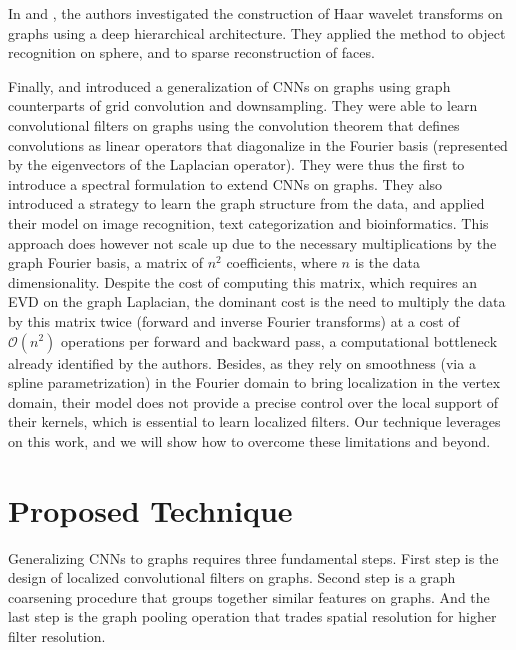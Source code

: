 \documentclass{article}
\newcommand{\bO}{\mathcal{O}}
\newcommand{\todo}[1]{{\color{red} #1 }}
\begin{document}
In \cite{pro:ChenChengMallat14deepHaar} and \cite{pro:RustamovGuibas14deepHaar},
the authors investigated the construction of Haar wavelet transforms on graphs
using a deep hierarchical architecture. They applied the method to object
recognition on sphere, and to sparse reconstruction of faces.

Finally, \cite{art:BrunaZarembaSzlamLeCun13DLgraphs} and
\cite{art:HenaffBrunaLeCun15DLgraphs} introduced a generalization of CNNs on
graphs using graph counterparts of grid convolution and downsampling. They were
able to learn convolutional filters on graphs using the convolution theorem
\cite{book:Mallat99wavelets} that defines convolutions as linear operators that
diagonalize in the Fourier basis (represented by the eigenvectors of the
Laplacian operator). They were thus the first to introduce a spectral
formulation to extend CNNs on graphs. They also introduced a strategy to learn
the graph structure from the data, and applied their model on image recognition,
text categorization and bioinformatics. This approach does however not scale up due
to the necessary multiplications by the graph Fourier basis, a matrix of $n^2$
coefficients, where $n$ is the data dimensionality. Despite the cost of
computing this matrix, which requires an EVD on the graph Laplacian, the
dominant cost is the need to multiply the data by this matrix twice (forward and
inverse Fourier transforms) at a cost of $\bO(n^2)$ operations per forward and
backward pass, a computational bottleneck already identified by the authors.
Besides, as they rely on smoothness (via a spline parametrization) in the
Fourier domain to bring localization in the vertex domain, their model does not
provide a precise control over the local support of their kernels, which is
essential to learn localized filters. Our technique leverages on this work, and
we will show how to overcome these limitations and beyond.











\section{Proposed Technique}
Generalizing CNNs to graphs requires three fundamental steps. First step is the design of localized convolutional filters on graphs. Second step is a graph coarsening procedure that groups together similar features on graphs. And the last step is the graph pooling operation that trades spatial resolution for higher filter resolution. 
\end{document}
